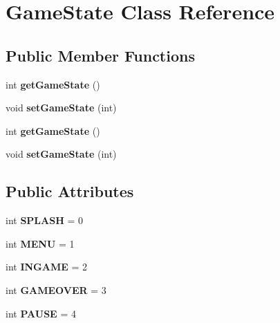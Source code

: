 \hypertarget{classGameState}{}\section{Game\+State Class Reference}
\label{classGameState}
\subsection*{Public Member Functions}
\begin{DoxyCompactItemize}
\item 
int {\bfseries get\+Game\+State} ()\hypertarget{classGameState_af20f310030244f07204b2e53b364332e}{}\label{classGameState_af20f310030244f07204b2e53b364332e}

\item 
void {\bfseries set\+Game\+State} (int)\hypertarget{classGameState_abb0ab40349a3094465a74643eb731e22}{}\label{classGameState_abb0ab40349a3094465a74643eb731e22}

\item 
int {\bfseries get\+Game\+State} ()\hypertarget{classGameState_af20f310030244f07204b2e53b364332e}{}\label{classGameState_af20f310030244f07204b2e53b364332e}

\item 
void {\bfseries set\+Game\+State} (int)\hypertarget{classGameState_abb0ab40349a3094465a74643eb731e22}{}\label{classGameState_abb0ab40349a3094465a74643eb731e22}

\end{DoxyCompactItemize}
\subsection*{Public Attributes}
\begin{DoxyCompactItemize}
\item 
int {\bfseries S\+P\+L\+A\+SH} = 0\hypertarget{classGameState_ade9e04b33f1dea1d62358a4f63b9a509}{}\label{classGameState_ade9e04b33f1dea1d62358a4f63b9a509}

\item 
int {\bfseries M\+E\+NU} = 1\hypertarget{classGameState_abd9f3d7cdc22931db952cc17010752a1}{}\label{classGameState_abd9f3d7cdc22931db952cc17010752a1}

\item 
int {\bfseries I\+N\+G\+A\+ME} = 2\hypertarget{classGameState_aae6641ae96366549f729c136cdcc5c5c}{}\label{classGameState_aae6641ae96366549f729c136cdcc5c5c}

\item 
int {\bfseries G\+A\+M\+E\+O\+V\+ER} = 3\hypertarget{classGameState_a994c426ab97d2c6e186c13fd357ccc68}{}\label{classGameState_a994c426ab97d2c6e186c13fd357ccc68}

\item 
int {\bfseries P\+A\+U\+SE} = 4\hypertarget{classGameState_a1353d084bf0c63bd879656de599db4b5}{}\label{classGameState_a1353d084bf0c63bd879656de599db4b5}

\end{DoxyCompactItemize}


